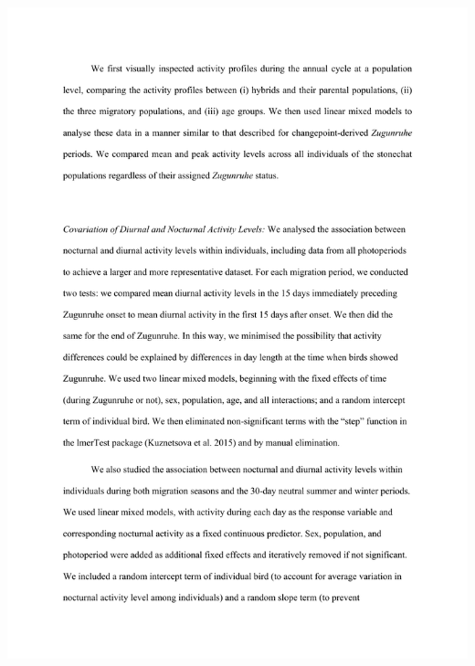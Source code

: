 \documentclass[a4paper, twoside]{templates/ociamthesis}
\begin{document}
\includegraphics[width=1\linewidth]{pdf_chapters/zug/zug_supp_crop_Part8}
\end{document}
